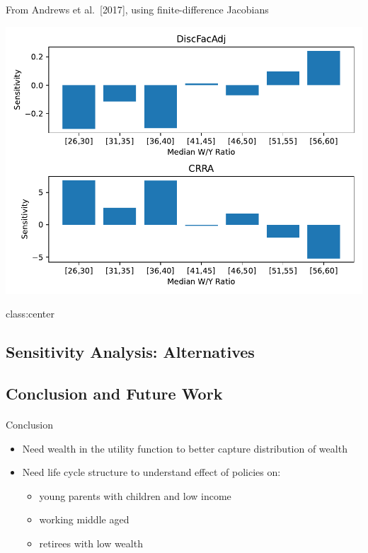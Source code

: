 \documentclass[
  letterpaper,
  DIV=11,
  numbers=noendperiod]{scrartcl}
\makeatletter
\let\oldparagraph\paragraph
\renewcommand{\paragraph}{
    \@ifstar
      \xxxParagraphStar
      \xxxParagraphNoStar
  }
\newcommand{\xxxParagraphStar}[1]{\oldparagraph*{#1}\mbox{}}
\newcommand{\xxxParagraphNoStar}[1]{\oldparagraph{#1}\mbox{}}
\providecommand{\tightlist}{%
  \setlength{\itemsep}{0pt}\setlength{\parskip}{0pt}}\usepackage{longtable,booktabs,array}
\makeatother
\begin{document}
From Andrews et al.~{[}2017{]}, using finite-difference Jacobians

\includegraphics{slides_files/mediabag/../Figures/IndShockSensitivity.pdf}

class:center

\subsection{Sensitivity Analysis:
Alternatives}\label{sensitivity-analysis-alternatives}

\subsection{Conclusion and Future
Work}\label{conclusion-and-future-work}

\paragraph{Conclusion}\label{conclusion}

\begin{itemize}
\tightlist
\item
  Need wealth in the utility function to better capture distribution of
  wealth
\item
  Need life cycle structure to understand effect of policies on:

  \begin{itemize}
  \tightlist
  \item
    young parents with children and low income
  \item
    working middle aged
  \item
    retirees with low wealth
  \end{itemize}
\end{itemize}
\end{document}
